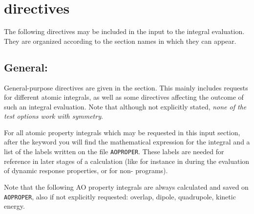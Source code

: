 \section{ directives}\label{sec:herinp}

          The following directives may be included in the input to
the integral evaluation.  They are organized according to the
section names in which they can appear.

%


\subsection{General: }

General-purpose directives are given in the 
section. This mainly includes requests for different atomic integrals,
as well as some
directives affecting the outcome of such an integral evaluation. Note
that although not explicitly stated, {\em none of the test options
work with symmetry}.

For all atomic property integrals which may be requested in this input section,
after the keyword you will find the mathematical expression for the integral 
and a list of the labels written on the file
\texttt{AOPROPER}.
These labels are needed for
reference in later stages of a {\dalton} calculation (like for instance
in during the evaluation of dynamic response properties, or for
non-{\dalton} programs).

Note that the following AO property integrals  are
always calculated and saved on \texttt{AOPROPER}, also if not explicitly requested:
overlap, dipole, quadrupole, kinetic energy.

